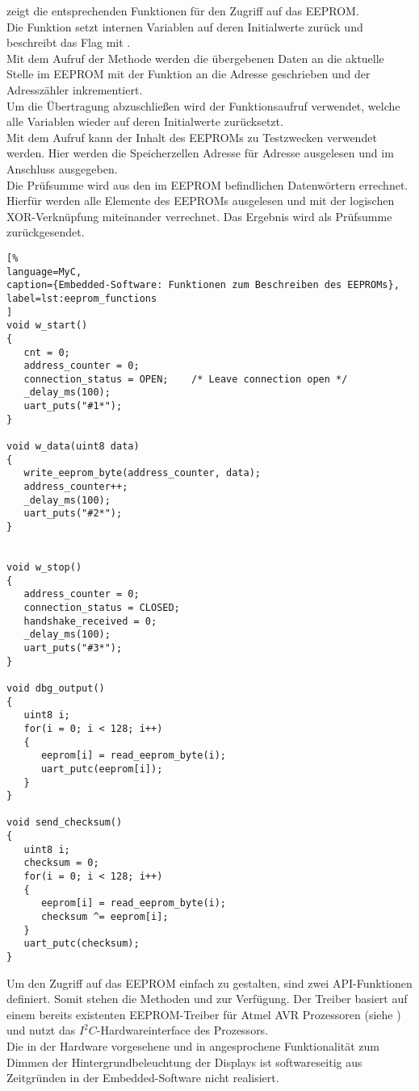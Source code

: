  zeigt die entsprechenden Funktionen für den Zugriff auf das EEPROM.\\
Die Funktion  setzt internen Variablen auf deren Initialwerte zurück und beschreibt das Flag   mit .\\
Mit dem Aufruf der Methode  werden die übergebenen Daten  an die aktuelle Stelle im EEPROM mit der Funktion  an die Adresse  geschrieben und der Adresszähler inkrementiert.\\
Um die Übertragung abzuschließen wird der Funktionsaufruf  verwendet, welche alle Variablen wieder auf deren Initialwerte zurücksetzt.\\
Mit dem Aufruf  kann der Inhalt des EEPROMs zu Testzwecken verwendet werden. Hier werden die Speicherzellen Adresse für Adresse ausgelesen und im Anschluss ausgegeben.\\
Die Prüfsumme wird aus den im EEPROM befindlichen Datenwörtern errechnet. Hierfür werden alle Elemente des EEPROMs ausgelesen und mit der logischen XOR-Verknüpfung miteinander verrechnet. Das Ergebnis wird als Prüfsumme zurückgesendet. 

\begin{lstlisting}[%
language=MyC,
caption={Embedded-Software: Funktionen zum Beschreiben des EEPROMs},
label=lst:eeprom_functions
]
void w_start()
{
   cnt = 0;
   address_counter = 0;
   connection_status = OPEN;    /* Leave connection open */
   _delay_ms(100);
   uart_puts("#1*");
}

void w_data(uint8 data)
{
   write_eeprom_byte(address_counter, data);
   address_counter++;
   _delay_ms(100);
   uart_puts("#2*");
}


void w_stop()
{
   address_counter = 0;
   connection_status = CLOSED;
   handshake_received = 0;
   _delay_ms(100);
   uart_puts("#3*");
}

void dbg_output()
{
   uint8 i;
   for(i = 0; i < 128; i++)
   {
      eeprom[i] = read_eeprom_byte(i);
      uart_putc(eeprom[i]);
   }
}

void send_checksum()
{
   uint8 i;
   checksum = 0;
   for(i = 0; i < 128; i++)
   {
      eeprom[i] = read_eeprom_byte(i);
      checksum ^= eeprom[i];
   }
   uart_putc(checksum);
}
\end{lstlisting}%
Um den Zugriff auf das EEPROM einfach zu gestalten, sind zwei API-Funktionen definiert. Somit stehen die Methoden  und  zur Verfügung. Der Treiber basiert auf einem bereits existenten EEPROM-Treiber für Atmel AVR Prozessoren (siehe \cite{eeprom_lib}) und nutzt das $I^2C$-Hardwareinterface des Prozessors. \\
Die in der Hardware vorgesehene und in  angesprochene Funktionalität zum Dimmen der Hintergrundbeleuchtung der Displays ist softwareseitig aus Zeitgründen in der Embedded-Software nicht realisiert. 
